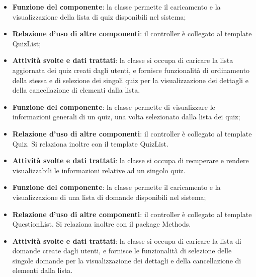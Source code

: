 
\begin{itemize}
	\item\textbf{Funzione del componente}:  la classe permette il caricamento e la visualizzazione della lista di quiz disponibili nel sistema;
	\item\textbf{Relazione d'uso di altre componenti}: il controller è collegato al template QuizList;
	\item\textbf{Attività svolte e dati trattati}: la classe si occupa di caricare la lista aggiornata dei quiz creati dagli utenti, e fornisce funzionalità di ordinamento della stessa e di selezione dei singoli quiz per la visualizzazione dei dettagli e della cancellazione di elementi dalla lista. 
\end{itemize}


\begin{itemize}
	\item\textbf{Funzione del componente}: la classe permette di visualizzare le informazioni generali di un quiz, una volta selezionato dalla lista dei quiz;
	\item\textbf{Relazione d'uso di altre componenti}: il controller è collegato al template Quiz. Si relaziona inoltre con il template QuizList.
	\item\textbf{Attività svolte e dati trattati}: la classe si occupa di recuperare e rendere visualizzabili le informazioni relative ad un singolo quiz.
\end{itemize}


\begin{itemize}
	\item\textbf{Funzione del componente}:  la classe permette il caricamento e la visualizzazione di una lista di domande disponibili nel sistema;
	\item\textbf{Relazione d'uso di altre componenti}: il controller è collegato al template QuestionList. Si relaziona inoltre con il package Methods.
	\item\textbf{Attività svolte e dati trattati}: la classe si occupa di caricare la lista di domande create dagli utenti, e fornisce le funzionalità di selezione delle singole domande per la visualizzazione dei dettagli e della cancellazione di elementi dalla lista. 
\end{itemize}


